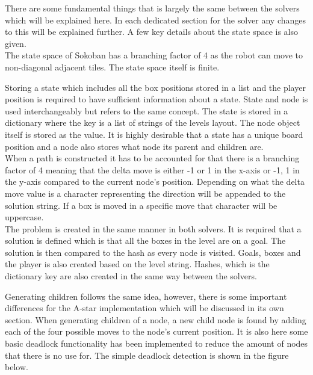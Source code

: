 \documentclass[../../main.tex]{subfiles}
\begin{document}
There are some fundamental things that is largely the same between the solvers which will be explained here. In each dedicated section for the solver any changes to this will be explained further. A few key details about the state space is also given. \\

The state space of Sokoban has a branching factor of 4 as the robot can move to non-diagonal adjacent tiles. The state space itself is finite.

Storing a state which includes all the box positions stored in a list and the player position is required to have 				sufficient 	information about a state. State and node is used interchangeably but refers to the same concept. The state is stored in a dictionary where the key is a list of strings of the levels layout. The node object itself is stored as the value. It is highly desirable that a state has a unique board position and a node also stores what node its parent and children are. \\

When a path is constructed it has to be accounted for that there is a branching factor of 4 meaning that the delta move is either -1 or 1 in the x-axis or -1, 1 in the y-axis compared to the current node's position. Depending on what the delta move value is a character representing the direction will be appended to the solution string. If a box is moved in a specific move that character will be uppercase. \\

The problem is created in the same manner in both solvers. It is required that a solution is defined which is that all the boxes in the level are on a goal. The solution is then compared to the hash as every node is visited. Goals, boxes and the player is also created based on the level string. Hashes, which is the dictionary key are also created in the same way between the solvers. 

Generating children follows the same idea, however, there is some important differences for the A-star implementation which will be discussed in its own section. When generating children of a node, a new child node is found by adding each of the four possible moves to the node's current position. It is also here some basic deadlock functionality has been implemented to reduce the amount of nodes that there is no use for. The simple deadlock detection is shown in the figure below.
\end{document}
